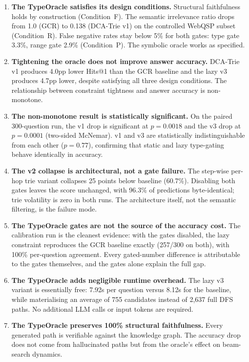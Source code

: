 \begin{enumerate}
  \item \textbf{The TypeOracle satisfies its design conditions.} Structural faithfulness holds by construction (Condition~F). The semantic irrelevance ratio drops from 1.0 (GCR) to 0.138 (DCA-Trie v1) on the controlled WebQSP subset (Condition~R). False negative rates stay below 5\% for both gates: type gate 3.3\%, range gate 2.9\% (Condition~P). The symbolic oracle works as specified.

  \item \textbf{Tightening the oracle does not improve answer accuracy.} DCA-Trie v1 produces 4.0pp lower Hits@1 than the GCR baseline and the lazy v3 produces 4.7pp lower, despite satisfying all three design conditions. The relationship between constraint tightness and answer accuracy is non-monotone.

  \item \textbf{The non-monotone result is statistically significant.} On the paired 300-question run, the v1 drop is significant at $p = 0.0018$ and the v3 drop at $p = 0.0001$ (two-sided McNemar). v1 and v3 are statistically indistinguishable from each other ($p = 0.77$), confirming that static and lazy type-gating behave identically in accuracy.

  \item \textbf{The v2 collapse is architectural, not a gate failure.} The step-wise per-hop trie variant collapses 25 points below baseline (60.7\%). Disabling both gates leaves the score unchanged, with 96.3\% of predictions byte-identical; trie volatility is zero in both runs. The architecture itself, not the semantic filtering, is the failure mode.

  \item \textbf{The TypeOracle gates are not the source of the accuracy cost.} The calibration run is the cleanest evidence: with the gates disabled, the lazy constraint reproduces the GCR baseline exactly (257/300 on both), with 100\% per-question agreement. Every gated-number difference is attributable to the gates themselves, and the gates alone explain the full gap.

  \item \textbf{The TypeOracle adds negligible runtime overhead.} The lazy v3 variant is essentially free: 7.92s per question versus 8.12s for the baseline, while materialising an average of 755 candidates instead of 2,637 full DFS paths. No additional LLM calls or input tokens are required.

  \item \textbf{The TypeOracle preserves 100\% structural faithfulness.} Every generated path is verifiable against the knowledge graph. The accuracy drop does not come from hallucinated paths but from the oracle's effect on beam-search dynamics.
\end{enumerate}

